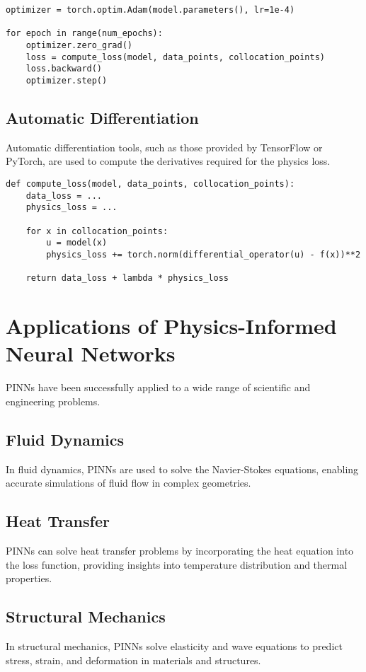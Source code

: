 \begin{verbatim}
optimizer = torch.optim.Adam(model.parameters(), lr=1e-4)

for epoch in range(num_epochs):
    optimizer.zero_grad()
    loss = compute_loss(model, data_points, collocation_points)
    loss.backward()
    optimizer.step()
\end{verbatim}

\subsection{Automatic Differentiation}
Automatic differentiation tools, such as those provided by TensorFlow or PyTorch, are used to compute the derivatives required for the physics loss.

\begin{verbatim}
def compute_loss(model, data_points, collocation_points):
    data_loss = ...
    physics_loss = ...

    for x in collocation_points:
        u = model(x)
        physics_loss += torch.norm(differential_operator(u) - f(x))**2

    return data_loss + lambda * physics_loss
\end{verbatim}

\section{Applications of Physics-Informed Neural Networks}
PINNs have been successfully applied to a wide range of scientific and engineering problems.

\subsection{Fluid Dynamics}
In fluid dynamics, PINNs are used to solve the Navier-Stokes equations, enabling accurate simulations of fluid flow in complex geometries.

\subsection{Heat Transfer}
PINNs can solve heat transfer problems by incorporating the heat equation into the loss function, providing insights into temperature distribution and thermal properties.

\subsection{Structural Mechanics}
In structural mechanics, PINNs solve elasticity and wave equations to predict stress, strain, and deformation in materials and structures.

